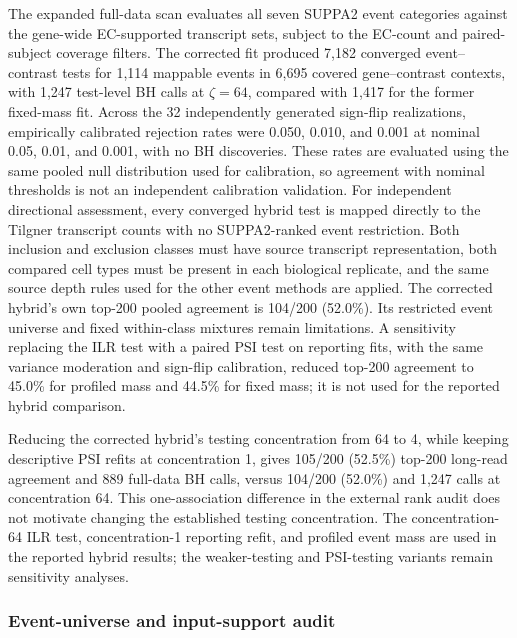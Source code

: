\documentclass[11pt]{article}
\begin{document}
The expanded full-data scan evaluates all seven SUPPA2 event categories against the gene-wide EC-supported transcript sets, subject to the EC-count and paired-subject coverage filters. The corrected fit produced 7,182 converged event--contrast tests for 1,114 mappable events in 6,695 covered gene--contrast contexts, with 1,247 test-level BH calls at \(\zeta=64\), compared with 1,417 for the former fixed-mass fit. Across the 32 independently generated sign-flip realizations, empirically calibrated rejection rates were 0.050, 0.010, and 0.001 at nominal 0.05, 0.01, and 0.001, with no BH discoveries. These rates are evaluated using the same pooled null distribution used for calibration, so agreement with nominal thresholds is not an independent calibration validation. For independent directional assessment, every converged hybrid test is mapped directly to the Tilgner transcript counts with no SUPPA2-ranked event restriction. Both inclusion and exclusion classes must have source transcript representation, both compared cell types must be present in each biological replicate, and the same source depth rules used for the other event methods are applied. The corrected hybrid's own top-200 pooled agreement is 104/200 (52.0\%). Its restricted event universe and fixed within-class mixtures remain limitations. A sensitivity replacing the ILR test with a paired PSI test on reporting fits, with the same variance moderation and sign-flip calibration, reduced top-200 agreement to 45.0\% for profiled mass and 44.5\% for fixed mass; it is not used for the reported hybrid comparison.

Reducing the corrected hybrid's testing concentration from 64 to 4, while keeping descriptive PSI refits at concentration 1, gives 105/200 (52.5\%) top-200 long-read agreement and 889 full-data BH calls, versus 104/200 (52.0\%) and 1,247 calls at concentration 64. This one-association difference in the external rank audit does not motivate changing the established testing concentration. The concentration-64 ILR test, concentration-1 reporting refit, and profiled event mass are used in the reported hybrid results; the weaker-testing and PSI-testing variants remain sensitivity analyses.

\subsubsection{Event-universe and input-support audit}
\end{document}
